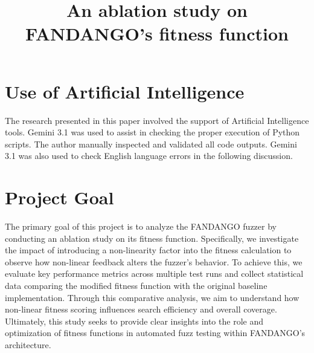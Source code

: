 \documentclass[conference]{IEEEtran}
\begin{document}
\title{An ablation study on FANDANGO's fitness function\\
}

\author{
}

\maketitle



\section*{Use of Artificial Intelligence}
The research presented in this paper involved the support of Artificial Intelligence tools. Gemini 3.1 was used to assist in checking the proper execution of Python scripts. The author manually inspected and validated all code outputs.
Gemini 3.1 was also used to check English language errors in the following discussion.



\section{Project Goal}
The primary goal of this project is to analyze the FANDANGO \cite{zamudio2025fandango} fuzzer by conducting an ablation study on its fitness function. Specifically, we investigate the impact of introducing a non-linearity factor into the fitness calculation to observe how non-linear feedback alters the fuzzer’s behavior. To achieve this, we evaluate key performance metrics across multiple test runs and collect statistical data comparing the modified fitness function with the original baseline implementation. Through this comparative analysis, we aim to understand how non-linear fitness scoring influences search efficiency and overall coverage. Ultimately, this study seeks to provide clear insights into the role and optimization of fitness functions in automated fuzz testing within FANDANGO's architecture.
\end{document}
